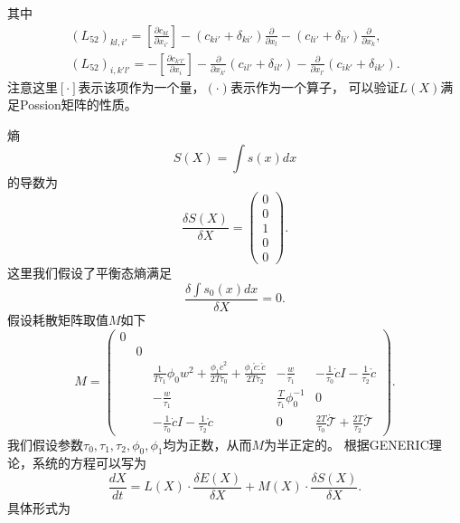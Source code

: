 	其中
	\begin{eqnarray*}
		(L_{52})_{kl,i'} = [\frac{\partial {c_{kl}}}{\partial x_{i'}}] - (c_{ki'} + \delta_{ki'}) \frac{\partial}{\partial x_l} - ( c_{li'} + \delta_{li'}) \frac{\partial}{\partial x_{k}}, \\
		(L_{52})_{i,k'l'} = -[\frac{\partial {c_{k'l'}}}{\partial x_{i}}] - \frac{\partial}{\partial x_{k'}} (c_{il'} + \delta_{il'})  - \frac{\partial}{\partial x_{l'}} ( c_{ik'} + \delta_{ik'}).
	\end{eqnarray*}
	注意这里$[\cdot]$表示该项作为一个量，$(\cdot)$表示作为一个算子，
	可以验证$L(X)$满足Possion矩阵的性质。

	熵
	\begin{equation}
		S(X) = \int s(x) dx
	\end{equation}
	的导数为
	\begin{equation*}
		\frac{\delta S(X)}{ \delta X} = \left( \begin{array}{c} 0 \\ 0 \\ 1 \\  0 \\ 0 \end{array} \right).
	\end{equation*}
	这里我们假设了平衡态熵满足
	\begin{equation}
		\frac{\delta \int s_0(x) dx}{ \delta X} = 0. 
	\end{equation}
	假设耗散矩阵取值$M$如下
	\begin{equation*}
		M = \left( \begin{array}{ccccc} 
		0 & & & & \\
		& 0 & & &  \\
		& & \frac{1}{T \tau_1} \phi_0 w^2 + \frac{\phi_1 \dot{c}^2}{2 T \tau_0} + \frac{\phi_1 \mathring{c}:\mathring{c}}{2 T \tau_2} & -\frac{w}{\tau_1} & -\frac{1}{\tau_0} \dot{c} I - \frac{1}{\tau_2} \mathring{c} \\  
		& &  -\frac{w}{\tau_1} & \frac{T}{\tau_1} \phi_0^{-1} & 0  \\
	    & &  -\frac{1}{\tau_0} \dot{c} I - \frac{1}{\tau_2} \mathring{c} & 0 & \frac{2T}{\tau_0} \dot{\mathcal{T}}   + \frac{2T}{\tau_2}  \mathring{\mathcal{T}}   
		\end{array} \right).
	\end{equation*}
	我们假设参数$\tau_0,\tau_1,\tau_2,\phi_0,\phi_1$均为正数，从而$M$为半正定的。
	根据GENERIC理论，系统的方程可以写为
	\begin{equation*}
		\frac{dX}{dt} = L(X) \cdot \frac{\delta E(X)}{\delta X} + M(X) \cdot \frac{\delta S(X)}{\delta X} .
	\end{equation*}
	具体形式为
	
